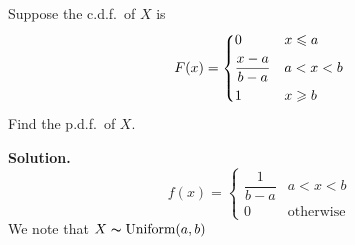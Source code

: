 \begin{Example}{}{}
    Suppose the c.d.f.\ of $ X $ is
    \[ F(x)=\begin{dcases}
            0               & x\leqslant a \\
            \frac{x-a}{b-a} & a<x<b        \\
            1               & x\geqslant b
        \end{dcases} \]
    Find the p.d.f.\ of $ X $.

    \textbf{Solution.}
    \[ f(x)=
        \begin{cases}
            \dfrac{1}{b-a} & a<x<b            \\
            0              & \text{otherwise}
        \end{cases} \]
    We note that $ X \thicksim \text{Uniform}(a,b) $
\end{Example}


